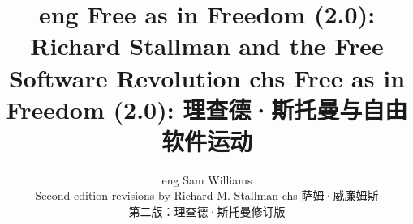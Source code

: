 \documentclass[UTF8, a4paper, 10pt]{book}
\def\eng{eng}
\def\chs{chs}
\begin{document}
\title{\ifdefined\eng
Free as in Freedom (2.0): Richard Stallman and the Free Software Revolution
\fi
\ifdefined\chs
Free as in Freedom (2.0): 理查德·斯托曼与自由软件运动
\fi
}
\author{\ifdefined\eng
Sam Williams \\ Second edition revisions by Richard M. Stallman
\fi
\ifdefined\chs
萨姆·威廉姆斯 \\ 第二版：理查德·斯托曼修订版
\fi}
\date{}

\maketitle
\thispagestyle{empty}
\frontmatter

\thispagestyle{empty}
\tableofcontents



\mainmatter














\backmatter



\printindex

\end{document}
